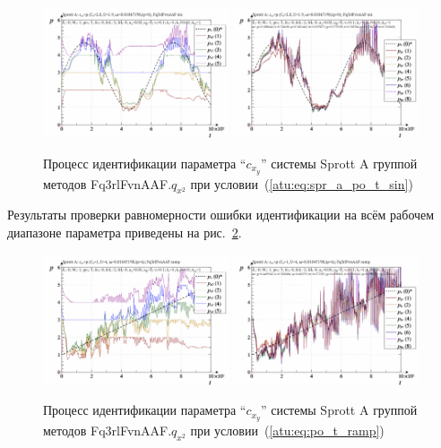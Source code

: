 \begin{figure}[htb!]
  \centerline{
    \includegraphics[width=0.49\textwidth]{p/cha/spr_a/Fq3rlFvnAAF_x2/sprott_a_id-p_t_pi_Fq3rlFvnAAF_sin.png}
    \hfill
    \includegraphics[width=0.49\textwidth]{p/cha/spr_a/Fq3rlFvnAAF_x2/sprott_a_id-p_t_p_Fq3rlFvnAAF_sin.png}
  }
  \caption{Процесс идентификации параметра ``$c_{x_y}$'' системы Sprott A группой методов Fq3rlFvnAAF.$q_{x^2}$ при условии~(\ref{atu:eq:spr_a_po_t_sin})}
  \label{atu:f:spr_a_id_Fq3rlFvnAAF_q_x2_sin}
\end{figure}

Результаты проверки равномерности ошибки идентификации на всём рабочем диапазоне параметра
приведены на рис.~\ref{atu:f:spr_a_id_Fq3rlFvnAAF_q_x2_ramp}.


\begin{figure}[htb!]
  \centerline{
    \includegraphics[width=0.49\textwidth]{p/cha/spr_a/Fq3rlFvnAAF_x2/sprott_a_id-p_t_pi_Fq3rlFvnAAF_ramp.png}
    \hfill
    \includegraphics[width=0.49\textwidth]{p/cha/spr_a/Fq3rlFvnAAF_x2/sprott_a_id-p_t_p_Fq3rlFvnAAF_ramp.png}
  }
    \caption{Процесс идентификации параметра ``$c_{x_y}$'' системы Sprott A группой методов Fq3rlFvnAAF.$q_{x^2}$ при условии~(\ref{atu:eq:po_t_ramp})}
  \label{atu:f:spr_a_id_Fq3rlFvnAAF_q_x2_ramp}
\end{figure}

